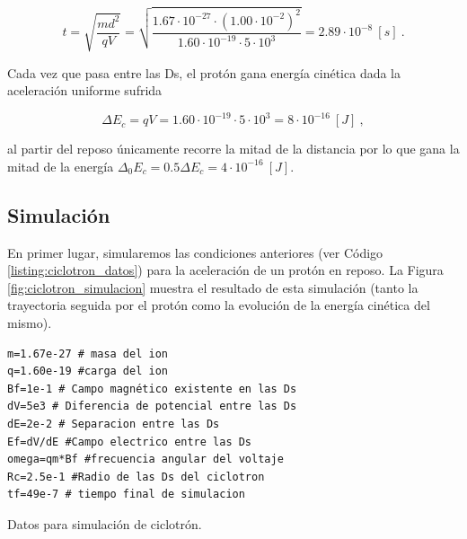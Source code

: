 \documentclass[journal]{IEEEtran}
\newenvironment{code}{\captionsetup{type=listing}}{\par\addvspace{\baselineskip}}
\begin{document}
\begin{equation}
t = \sqrt{\displaystyle\frac{md^2}{qV}} = \sqrt{\displaystyle\frac{1.67\cdot 10^{-27}\cdot (1.00\cdot 10^{-2})^2}{1.60\cdot 10^{-19}\cdot 5\cdot 10^3}} = 2.89\cdot 10^{-8}~[s]~.
\end{equation}

Cada vez que pasa entre las Ds, el protón gana energía cinética dada la aceleración uniforme sufrida

\begin{equation}
\Delta E_c = qV = 1.60\cdot 10^{-19} \cdot 5\cdot 10^3 = 8\cdot 10^{-16}~[J]~,
\end{equation}

al partir del reposo únicamente recorre la mitad de la distancia por lo que gana la mitad de la energía $\Delta_0 E_c = 0.5 \Delta E_c = 4\cdot 10^{-16}~[J]$.

\subsection{Simulación}

En primer lugar, simularemos las condiciones anteriores (ver Código \ref{listing:ciclotron_datos}) para la aceleración de un protón en reposo. La Figura \ref{fig:ciclotron_simulacion} muestra el resultado de esta simulación (tanto la trayectoria seguida por el protón como la evolución de la energía cinética del mismo).

\bigskip

\begin{code}
    \begin{verbatim}
m=1.67e-27 # masa del ion
q=1.60e-19 #carga del ion
Bf=1e-1 # Campo magnético existente en las Ds
dV=5e3 # Diferencia de potencial entre las Ds
dE=2e-2 # Separacion entre las Ds 
Ef=dV/dE #Campo electrico entre las Ds
omega=qm*Bf #frecuencia angular del voltaje
Rc=2.5e-1 #Radio de las Ds del ciclotron
tf=49e-7 # tiempo final de simulacion
    \end{verbatim}
    \caption{Datos para simulación de ciclotrón.}
    \label{listing:ciclotron_datos}
\end{code}
\end{document}
